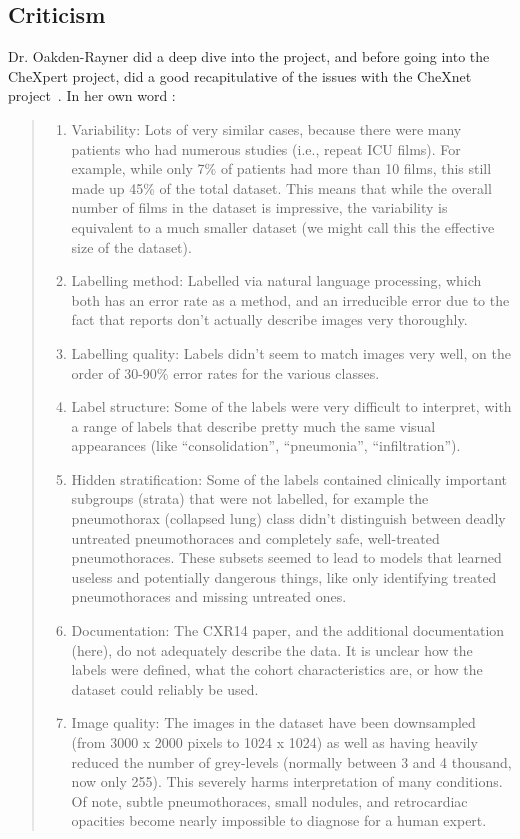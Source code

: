 \documentclass[11pt]{article}
\begin{document}
    \subsection{Criticism}
        Dr. Oakden-Rayner did a deep dive into the project, and before going into the CheXpert project, did a good
        recapitulative of the issues with the CheXnet project~\cite{chexpert_critic}. In her own word :
        \begin{quote}
            \begin{enumerate}

                \item Variability: Lots of very similar cases, because there were many patients who had numerous studies (i.e.,
                repeat ICU films). For example, while only 7\% of patients had more than 10 films, this still made up 45\% of the
                        total dataset. This means that while the overall number of films in the dataset is impressive, the variability is equivalent to a much smaller dataset (we might call this the effective size of the dataset).
                \item Labelling method: Labelled via natural language processing, which both has an error rate as a method, and an
                        irreducible error due to the fact that reports don’t actually describe images very thoroughly.
                \item Labelling quality: Labels didn’t seem to match images very well, on the order of 30-90\% error
                rates for the various classes.
                \item Label structure: Some of the labels were very difficult to interpret, with a range of labels that
                describe pretty much the same visual appearances (like “consolidation”, “pneumonia”, “infiltration”).
                \item Hidden stratification: Some of the labels contained clinically important subgroups (strata) that
                were not labelled, for example the pneumothorax (collapsed lung) class didn’t distinguish between deadly untreated pneumothoraces and completely safe, well-treated pneumothoraces. These subsets seemed to lead to models that learned useless and potentially dangerous things, like only identifying treated pneumothoraces and missing untreated ones.
                \item Documentation: The CXR14 paper, and the additional documentation (here), do not adequately
                describe the data. It is unclear how the labels were defined, what the cohort characteristics are, or how the dataset could reliably be used.
                \item Image quality: The images in the dataset have been downsampled (from 3000 x 2000 pixels to 1024 x
                1024) as well as having heavily reduced the number of grey-levels (normally between 3 and 4 thousand, now only 255). This severely harms interpretation of many conditions. Of note, subtle pneumothoraces, small nodules, and retrocardiac opacities become nearly impossible to diagnose for a human expert.
            \end{enumerate}
        \end{quote}
\end{document}
